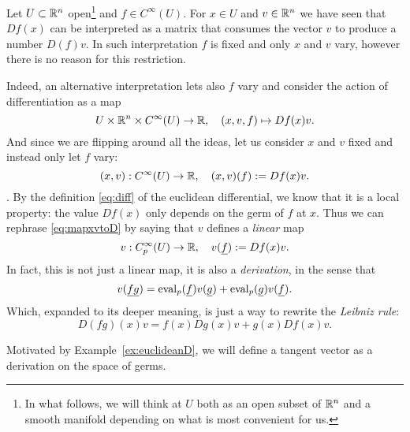 \begin{ex}\label{ex:euclideanD}
    Let $U\subset\mathbb{R}^n$ open\footnote{In what follows, we will think at $U$ both as an open subset of $\mathbb{R}^n$ and a smooth manifold depending on what is most convenient for us.} and $f\in C^\infty(U)$.
    For $x\in U$ and $v\in\mathbb{R}^n$ we have seen that $Df(x)$ can be interpreted as a matrix that consumes the vector $v$ to produce a number $D(f)v$.
    In such interpretation $f$ is fixed and only $x$ and $v$ vary, however there is no reason for this restriction.

    Indeed, an alternative interpretation lets also $f$ vary and consider the action of differentiation as a map
    \begin{equation}
        U \times \mathbb{R}^n \times C^\infty(U) \to \mathbb{R},\quad
        (x,v,f) \mapsto Df(x) v.
    \end{equation}
    And since we are flipping around all the ideas, let us consider $x$ and $v$ fixed and instead only let $f$ vary:
    \begin{equation}\label{eq:mapxvtoD}
        (x,v):C^\infty(U) \to\mathbb{R}, \quad (x,v)(f) := Df(x)v.
    \end{equation}.
    By the definition \eqref{eq:diff} of the euclidean differential, we know that it is a local property: the value $Df(x)$ only depends on the germ of $f$ at $x$.
    Thus we can rephrase \eqref{eq:mapxvtoD} by saying that $v$ defines a \emph{linear} map
    \begin{equation}
        v : C_p^\infty(U) \to \mathbb{R}, \quad
        v(\underline f) := Df(x) v.
    \end{equation}
    In fact, this is not just a linear map, it is also a \emph{derivation}, in the sense that
    \begin{equation}
        v(\underline f \underline g) =
            \operatorname{eval}_p(\underline f)v(\underline g)
            + \operatorname{eval}_p(\underline g)v(\underline f).
    \end{equation}
    Which, expanded to its deeper meaning, is just a way to rewrite the \emph{Leibniz rule}:
    \begin{equation}
        D(fg)(x) v = f(x)Dg(x)v + g(x) Df(x)v.
    \end{equation}
\end{ex}

Motivated by Example~\ref{ex:euclideanD}, we will define a tangent vector as a derivation on the space of germs.

